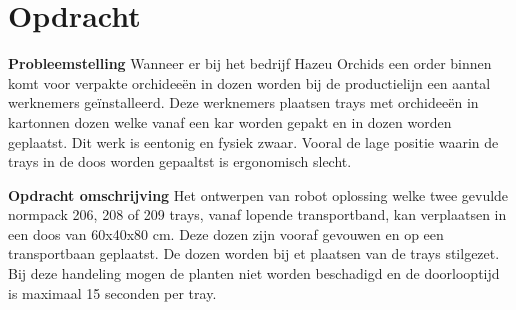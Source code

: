 \section{Opdracht}
	\textbf{Probleemstelling}
	Wanneer er bij het bedrijf Hazeu Orchids een order binnen komt voor verpakte orchideeën in dozen worden bij de productielijn een aantal werknemers geïnstalleerd. Deze werknemers plaatsen trays met orchideeën in kartonnen dozen welke vanaf een kar worden gepakt en in dozen worden geplaatst. Dit werk is eentonig en fysiek zwaar. Vooral de lage positie waarin de trays in de doos worden gepaaltst is ergonomisch slecht.
	\vspace{5mm}
	
	\textbf{Opdracht omschrijving}
	Het ontwerpen van robot oplossing welke twee gevulde normpack  206, 208 of 209 trays, vanaf lopende transportband, kan verplaatsen in een doos van 60x40x80 cm. Deze dozen zijn vooraf gevouwen en op een transportbaan geplaatst. De dozen worden bij et plaatsen van de trays stilgezet. Bij deze handeling mogen de planten niet worden beschadigd en de doorlooptijd is maximaal 15 seconden per tray.
	
	
\newpage